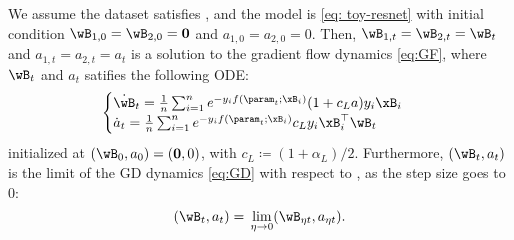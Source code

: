 \begin{lemma}
\label{lem:symmetry-toy}
We assume the dataset satisfies , and the model is \eqref{eq: toy-resnet} with initial condition  $\wB_{1,0} = \wB_{2,0} = \boldsymbol 0$ and $a_{1,0} = a_{2,0} = 0$. Then, $\wB_{1,t} = \wB_{2,t}= \wB_t$ and $a_{1,t} = a_{2,t} = a_t$ is a solution to the gradient flow dynamics \eqref{eq:GF}, where $\wB_t$ and $a_t$ satifies the following ODE:  
\begin{equation}
\label{eq: dynamic of w and a}
\begin{cases}
\dot \wB_t = \frac{1}{n} \sum_{i=1}^n e^{-y_i f(\param_t;\xB_i)} (1+ c_L a)y_i \xB_i\\ 
\dot a_t = \frac{1}{n} \sum_{i=1}^n e^{-y_i f(\param_t;\xB_i)}  c_L y_i \xB_i^\top \wB_t
\end{cases}
\end{equation}
initialized at $(\wB_0, a_0) = (\boldsymbol{0}, 0)$, with $c_L \coloneqq (1+\alpha_L)/2$. Furthermore, $(\wB_t, a_t)$ is the limit of the GD dynamics \eqref{eq:GD} with respect to , as the step size goes to $0$: 
\[
(\wB_t, a_t) = \, \lim_{\eta \to 0} ( \wB_{\eta t}, a_{\eta t} ). 
\]
\end{lemma}
